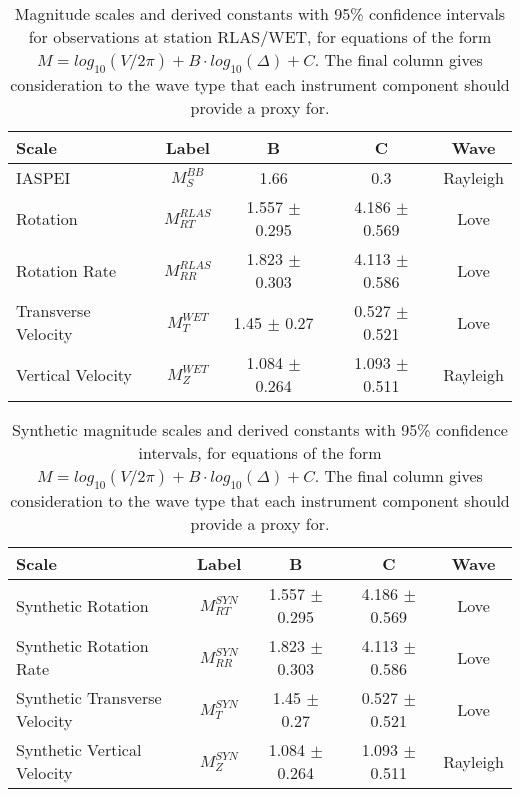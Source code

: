 \documentclass{gji}
\begin{document}
\begin{table*}
\begin{minipage}{115mm}
	\begin{center}
		\begin{tabular}{ |l|c|c|c|c| } 
		        \bf{Scale} & \bf{Label} & \bf{B} & \bf{C}  & \bf{Wave}\\ \hline
	IASPEI & $M_{S}^{BB}$ & 1.66 & 0.3  & Rayleigh \\ \hline
        Rotation  & $M^{RLAS}_{RT}$ & 1.557 $\pm$ 0.295 & 4.186 $\pm$ 0.569  & Love \\ \hline
	Rotation Rate & $M^{RLAS}_{RR}$ & 1.823 $\pm$ 0.303 & 4.113 $\pm$ 0.586  & Love\\ \hline 
        Transverse Velocity & $M^{WET}_T$ & 1.45 $\pm$ 0.27 & 0.527 $\pm$ 0.521 & Love \\ \hline
        Vertical Velocity  & $M^{WET}_Z$ & 1.084 $\pm$ 0.264 & 1.093 $\pm$ 0.511  & Rayleigh \\ \hline
		\end{tabular}
		
    		\caption{Magnitude scales and derived constants with 95\% confidence intervals for observations at station RLAS/WET, for equations of the form $M = log_{10}(V/2\pi) + B\cdot log_{10}(\Delta) + C$. The final column gives consideration to the wave type that each instrument component should provide a proxy for.}
		\label{tab:scales}
	\end{center}
	\end{minipage}
\end{table*}

\begin{table*}
\begin{minipage}{115mm}
	\begin{center}
		\begin{tabular}{ |l|c|c|c|c| } 
		        \bf{Scale} & \bf{Label} & \bf{B} & \bf{C}  & \bf{Wave}\\ \hline
        Synthetic Rotation  & $M^{SYN}_{RT}$ & 1.557 $\pm$ 0.295 & 4.186 $\pm$ 0.569  & Love \\ \hline
	Synthetic Rotation Rate & $M^{SYN}_{RR}$ & 1.823 $\pm$ 0.303 & 4.113 $\pm$ 0.586  & Love\\ \hline 
        Synthetic Transverse Velocity & $M^{SYN}_T$ & 1.45 $\pm$ 0.27 & 0.527 $\pm$ 0.521 & Love \\ \hline
        Synthetic Vertical Velocity  & $M^{SYN}_Z$ & 1.084 $\pm$ 0.264 & 1.093 $\pm$ 0.511  & Rayleigh \\ \hline
		\end{tabular}
		
    		\caption{Synthetic magnitude scales and derived constants with 95\% confidence intervals, for equations of the form $M = log_{10}(V/2\pi) + B\cdot log_{10}(\Delta) + C$. The final column gives consideration to the wave type that each instrument component should provide a proxy for.}
		\label{tab:syn_scales}
	\end{center}
	\end{minipage}
\end{table*}
\end{document}

